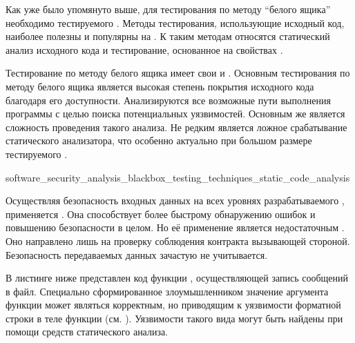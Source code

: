 %
Как уже было упомянуто выше, для тестирования  по методу ``белого ящика'' необходимо  тестируемого . 
%
Методы тестирования, использующие исходный код, наиболее полезны и популярны на . 
%
К таким методам относятся статический анализ исходного кода и тестирование, основанное на свойствах .

%
Тестирование по методу белого ящика имеет свои  и  . 
%
Основным  тестирования по методу белого ящика является высокая степень покрытия исходного кода благодаря его доступности. 
%
Анализируются все возможные пути выполнения программы с целью поиска потенциальных уязвимостей. 
%
Основным же  является сложность проведения такого анализа. 
%
Не редким является ложное срабатывание статического анализатора, что особенно актуально при большом размере тестируемого .


	{software_security_analysis_blackbox_testing_techniques_static_code_analysis}

%
Осуществляя безопасность входных данных на всех уровнях разрабатываемого , применяется . 
%
Она способствует более быстрому обнаружению ошибок и повышению безопасности  в целом. 
%
Но её применение является недостаточным . 
%
Оно направлено лишь на проверку соблюдения контракта вызывающей стороной. 
%
Безопасность передаваемых данных зачастую не учитывается. 

%
В листинге ниже представлен код функции , осуществляющей запись сообщений в файл. 
%
Специально сформированное злоумышленником значение аргумента функции  может являться корректным, но приводящим к уязвимости форматной строки  в теле функции (см. ). 
%
Уязвимости такого вида могут быть найдены при помощи средств статического анализа.

